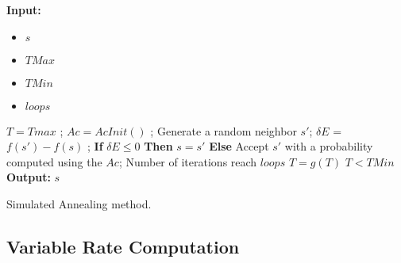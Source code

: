 \begin{algorithm}[t]
\textbf{Input:} 
\begin{itemize}
	\setlength{\itemsep}{1pt}
	\item $s$ 
	\item $TMax$ 
	\item $TMin$ 
	\item $loops$ 
\end{itemize}
\begin{algorithmic}
\State $T = Tmax$ ; 
\State $Ac = AcInit()$ ; 
\Repeat
	\Repeat	
		\State Generate a random neighbor $s'$;
		\State $\delta E$ = $f(s') - f(s)$ ;
		\State \textbf{If} $\delta E \leq 0$ \textbf{Then} $s = s'$ 
		\State \textbf{Else} Accept $s'$ with a probability computed using the $Ac$;
	\Until Number of iterations reach $loops$
	\State $T = g(T )$ 
\Until $T < TMin$
\State \textbf{Output:} $s$ 
\end{algorithmic}
\caption{Simulated Annealing method.}
\label{alg:SimulatedAnnealing}
\end{algorithm}

\subsection{Variable Rate Computation}

